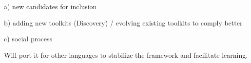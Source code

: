 a) new candidates for inclusion

b) adding new toolkits (Discovery) / evolving existing toolkits to comply better

c) social process

Will port it for other languages to stabilize the framework and facilitate learning.
